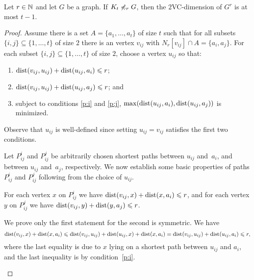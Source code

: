 \begin{theorem}
Let $r\in \mathbb{N}$ and let $G$ be a graph. 
If $K_t\not\preccurlyeq_r G$, then the $2$VC-dimension of $G^r$
is at most $t-1$. 
\end{theorem}
\begin{proof}
Assume there is a set $A=\{a_1,\ldots, a_t\}$ of size $t$ such that
for all subsets $\{i,j\}\subseteq \{1,\ldots,t\}$ of size $2$ 
there is an vertex $v_{ij}$ with 
$N_r[v_{ij}]\cap A=\{a_i,a_j\}$.
For each subset $\{i,j\}\subseteq \{1,\ldots,t\}$ of size $2$, choose a vertex $u_{ij}$ so that:
\begin{enumerate}[(1)]
\item\label{p:i} $\mathrm{dist}(v_{ij},u_{ij})+\mathrm{dist}(u_{ij},a_i)\leqslant r$;
\item\label{p:j} $\mathrm{dist}(v_{ij},u_{ij})+\mathrm{dist}(u_{ij},a_j)\leqslant r$; and
\item\label{p:min} subject to conditions \eqref{p:i} and \eqref{p:j}, $\max(\mathrm{dist}(u_{ij},a_i),\mathrm{dist}(u_{ij},a_j))$ is minimized.
\end{enumerate}
Observe that $u_{ij}$ is well-defined since setting $u_{ij}=v_{ij}$ satisfies the first two conditions.

Let $P^i_{ij}$ and $P^j_{ij}$ be arbitrarily chosen shortest paths between $u_{ij}$ and~$a_i$, and between $u_{ij}$ and~$a_j$, respectively.
We now establish some basic properties of paths $P^i_{ij}$ and $P^j_{ij}$ following from the choice of $u_{ij}$.

\begin{claim}\label{cl:ineq}
For each vertex $x$ on $P^i_{ij}$ we have $\mathrm{dist}(v_{ij},x)+\mathrm{dist}(x,a_i)\leqslant r$, and
for each vertex $y$ on $P^j_{ij}$ we have $\mathrm{dist}(v_{ij},y)+\mathrm{dist}(y,a_j)\leqslant r$.
\end{claim}
\begin{clproof}
We prove only the first statement for the second is symmetric.
We have
$$\mathrm{dist}(v_{ij},x)+\mathrm{dist}(x,a_{i})\leqslant \mathrm{dist}(v_{ij},u_{ij})+\mathrm{dist}(u_{ij},x)+\mathrm{dist}(x,a_{i})=\mathrm{dist}(v_{ij},u_{ij})+\mathrm{dist}(u_{ij},a_{i})\leqslant r,$$
where the last equality is due to $x$ lying on a shortest path between $u_{ij}$ and $a_i$, and the last inequality is by condition~\eqref{p:i}.
\end{clproof}


\end{proof}
